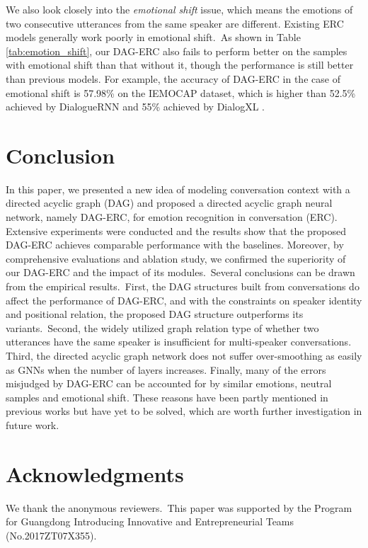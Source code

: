 \documentclass[11pt,a4paper]{article}
\begin{document}
We also look closely into the \emph{emotional shift} issue, which means the emotions of two consecutive utterances from the same speaker are different. 
Existing ERC models generally work poorly in emotional shift.~As shown in Table \ref{tab:emotion_shift}, our DAG-ERC also fails to perform better on the samples with emotional shift than that without it, though the performance is still better than previous models. For example, the accuracy of DAG-ERC in the case of emotional shift is 57.98\% on the IEMOCAP dataset, which is higher than 52.5\% achieved by DialogueRNN \citep{majumder2019dialoguernn} and 55\% achieved by DialogXL \citep{shen2020dialogxl}.


\section{Conclusion}
In this paper, we presented a new idea of modeling conversation context with a directed acyclic graph (DAG) and proposed a directed acyclic graph neural network, namely DAG-ERC, for emotion recognition in conversation (ERC). Extensive experiments were conducted and the results show that the proposed DAG-ERC achieves comparable performance with the baselines. Moreover, by comprehensive evaluations and ablation study, we confirmed the superiority of our DAG-ERC and the impact of its modules.~Several conclusions can be drawn from the empirical results.~First, the DAG structures built from conversations do affect the performance of DAG-ERC, and with the constraints on speaker identity and positional relation, the proposed DAG structure outperforms its variants.~Second, the widely utilized graph relation type of whether two utterances have the same speaker is insufficient for multi-speaker conversations. Third, the directed acyclic graph network does not suffer over-smoothing as easily as GNNs when the number of layers increases. Finally, many of the errors misjudged by DAG-ERC can be accounted for by similar emotions, neutral samples and emotional shift. These reasons have been partly mentioned in previous works but have yet to be solved, which are worth further investigation in future work.

\section*{Acknowledgments}
We thank the anonymous reviewers.~This paper was supported by the Program for Guangdong Introducing Innovative and Entrepreneurial Teams (No.2017ZT07X355).



\end{document}

